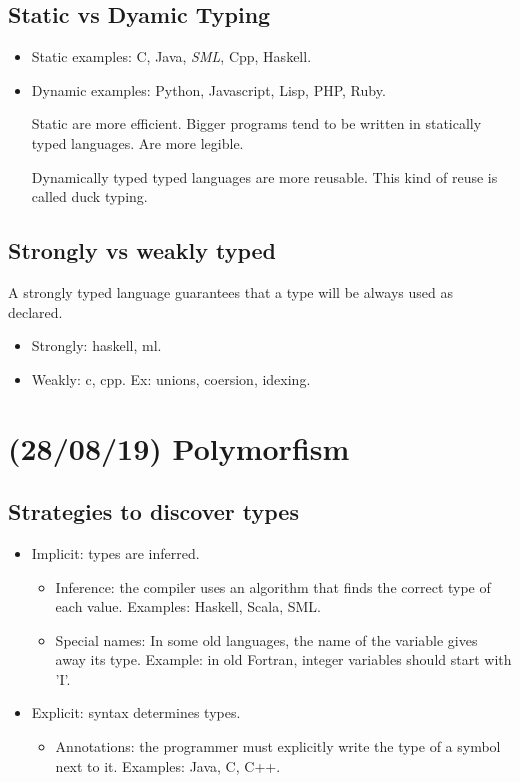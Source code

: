 \documentclass[11pt]{article}
\begin{document}
\subsection{Static vs Dyamic Typing}
\label{sec:orgf918fd0}
\begin{itemize}
\item Static examples: C, Java, \emph{SML}, Cpp, Haskell.
\item Dynamic examples: Python, Javascript, Lisp, PHP, Ruby.

Static are more efficient. Bigger programs tend to be written in statically typed
languages. Are more legible.

Dynamically typed typed languages are more reusable. This kind of reuse is called
duck typing.
\end{itemize}

\subsection{Strongly vs weakly typed}
\label{sec:orgacc2bba}
A strongly typed language guarantees that a type will be always used as declared.

\begin{itemize}
\item Strongly: haskell, ml.
\item Weakly: c, cpp. Ex: unions, coersion, idexing.
\end{itemize}

\section{(28/08/19) Polymorfism}
\label{sec:org50107f8}
\subsection{Strategies to discover types}
\label{sec:org849538d}
\begin{itemize}
\item Implicit: types are inferred.
\begin{itemize}
\item Inference: the compiler uses an algorithm that finds the correct type of
each value. Examples: Haskell, Scala, SML.
\item Special names: In some old languages, the name of the variable gives away
its type. Example: in old Fortran, integer variables should start with 'I'.
\end{itemize}
\item Explicit: syntax determines types.
\begin{itemize}
\item Annotations: the programmer must explicitly write the type of a symbol
next to it. Examples: Java, C, C++.
\end{itemize}
\end{itemize}
\end{document}
